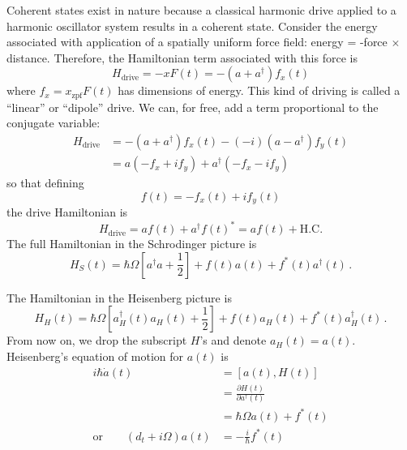 
Coherent states exist in nature because a classical harmonic drive applied to a harmonic oscillator system results in a coherent state.
Consider the energy associated with application of a spatially uniform force field: energy = -force $\times$ distance.
Therefore, the Hamiltonian term associated with this force is
\begin{equation}
  H_{\textrm{drive}}
  = -x F(t)
  = -(a + a^\dagger) f_x(t)
\end{equation}
where $f_{x} = x_\text{zpf} F(t)$ has dimensions of energy.
This kind of driving is called a ``linear'' or ``dipole'' drive.
We can, for free, add a term proportional to the conjugate variable:
\begin{align*}
  H_{\textrm{drive}}
  &=  -(a+a^{\dagger})f_{x}(t)-(-i)(a-a^{\dagger})f_{y}(t)\\
  &= a(-f_{x}+if_{y})+a^{\dagger}(-f_{x}-if_{y})
\end{align*}
so that defining
\begin{equation}
  f(t) = -f_x(t) + i f_y(t)
\end{equation}
the drive Hamiltonian is
\begin{equation*}
  H_{\textrm{drive}} = af(t)+a^{\dagger}f(t)^{*} = af(t)+\textrm{H.C.}
\end{equation*}
The full Hamiltonian in the Schrodinger picture is
\begin{equation}
  H_S(t)
  = \hbar\Omega\left[a^{\dagger} a + \frac{1}{2} \right] + f(t) a(t) + f^*(t) a^\dagger(t)
  \, .
\end{equation}



The Hamiltonian in the Heisenberg picture is
\begin{equation}
  H_H(t)
  = \hbar\Omega\left[a_H^{\dagger}(t)a_H(t) + \frac{1}{2}\right] + f(t)a_H(t) + f^{*}(t)a_H^{\dagger}(t)
  \, .
\end{equation}
From now on, we drop the subscript $H$'s and denote $a_H(t) = a(t)$.
Heisenberg's equation of motion for $a(t)$ is
\begin{align*}
  i\hbar\dot{a}(t)
  &= \left[ a(t), H(t) \right] \\
  &= \frac{\partial H(t)}{\partial a^{\dagger}(t)} \\
  &= \hbar\Omega a(t) + f^{*}(t) \\
  \textrm{or} \qquad
  \left(d_{t}+i\Omega\right)a(t) &= -\frac{i}{\hbar}f^{*}(t)
\end{align*}

